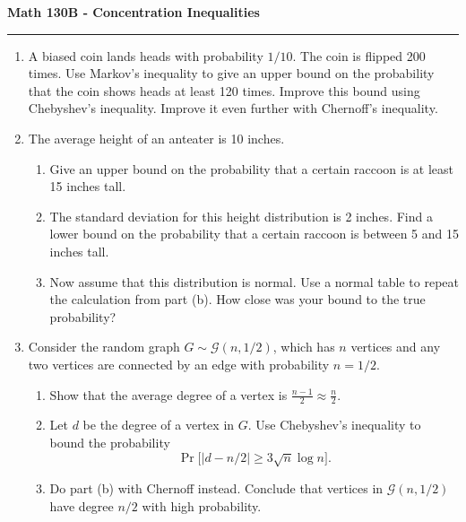 \documentclass[11pt,letterpaper]{report}
\newcommand{\mcal}[1]{\mathcal{#1}}
\begin{document}
\begin{center}
{\bf \Large Math 130B - Concentration Inequalities}
\vspace{0.2cm}
\hrule
\end{center}

\begin{enumerate}
	\item A biased coin lands heads with probability $1/10$. The coin is flipped 200 times. Use Markov's inequality to give an upper bound on the probability that the coin shows heads at least 120 times. Improve this bound using Chebyshev's inequality. Improve it even further with Chernoff's inequality.

	\vfill

	\item The average height of an anteater is 10 inches.
	\begin{enumerate}
		\item Give an upper bound on the probability that a certain raccoon is at least 15 inches tall.
		\vfill
		\item The standard deviation for this height distribution is 2 inches. Find a lower bound on the probability that a certain raccoon is between 5 and 15 inches tall.
		\vfill
		\item Now assume that this distribution is normal. Use a normal table to repeat the calculation from part (b). How close was your bound to the true probability?
	\end{enumerate}
	\vfill

	\item Consider the random graph $G \sim \mcal{G}(n, 1/2)$, which has $n$ vertices and any two vertices are connected by an edge with probability $n=1/2$.
	\begin{enumerate}
		\item Show that the average degree of a vertex is $\frac{n-1}{2}\approx \frac{n}{2}$.
		\vfill
		\item Let $d$ be the degree of a vertex in $G$. Use Chebyshev's inequality to bound the probability
		\[
		\Pr\big[|d - n/2| \geq 3\sqrt{n}\log n\big].
		\]
		\vfill
		\item Do part (b) with Chernoff instead. Conclude that vertices in $\mcal{G}(n, 1/2)$ have degree $n/2$ with high probability.
		\vfill
	\end{enumerate}
\end{enumerate}
\end{document}
